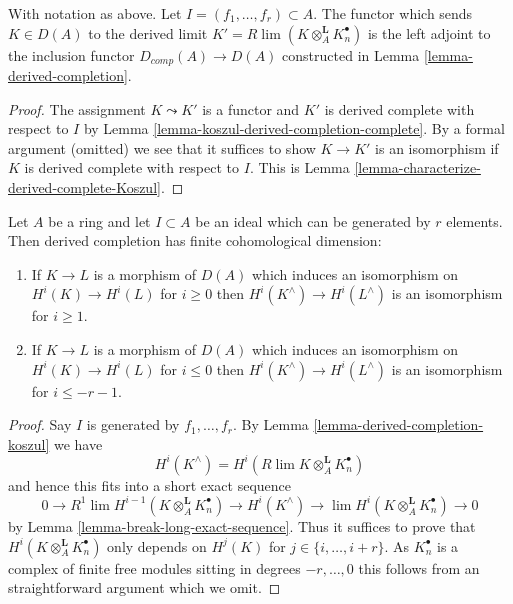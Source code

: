 \begin{lemma}
\label{lemma-derived-completion-koszul}
With notation as above. Let $I = (f_1, \ldots, f_r) \subset A$.
The functor which sends $K \in D(A)$ to the derived limit
$K' = R\lim( K \otimes_A^\mathbf{L} K_n^\bullet )$ is the left
adjoint to the inclusion functor $D_{comp}(A) \to D(A)$
constructed in Lemma \ref{lemma-derived-completion}.
\end{lemma}

\begin{proof}
The assignment $K \leadsto K'$ is a functor and $K'$ is derived
complete with respect to $I$ by
Lemma \ref{lemma-koszul-derived-completion-complete}.
By a formal argument (omitted) we see that it suffices
to show $K \to K'$ is an isomorphism if $K$ is derived complete
with respect to $I$. This is
Lemma \ref{lemma-characterize-derived-complete-Koszul}.
\end{proof}

\begin{lemma}
\label{lemma-derived-completion-finite-cohomological-dimension}
Let $A$ be a ring and let $I \subset A$ be an ideal which can be
generated by $r$ elements. Then derived completion has finite
cohomological dimension:
\begin{enumerate}
\item If $K \to L$ is a morphism of $D(A)$ which induces an isomorphism
on $H^i(K) \to H^i(L)$ for $i \geq 0$ then $H^i(K^\wedge) \to H^i(L^\wedge)$
is an isomorphism for $i \geq 1$.
\item If $K \to L$ is a morphism of $D(A)$ which induces an isomorphism
on $H^i(K) \to H^i(L)$ for $i \leq 0$ then $H^i(K^\wedge) \to H^i(L^\wedge)$
is an isomorphism for $i \leq -r - 1$.
\end{enumerate}
\end{lemma}

\begin{proof}
Say $I$ is generated by $f_1, \ldots, f_r$. By
Lemma \ref{lemma-derived-completion-koszul} we have
$$
H^i(K^\wedge) = H^i(R\lim K \otimes_A^\mathbf{L} K_n^\bullet)
$$
and hence this fits into a short exact sequence
$$
0 \to R^1\lim H^{i - 1}(K \otimes_A^\mathbf{L} K_n^\bullet)
\to H^i(K^\wedge) \to \lim H^i(K \otimes_A^\mathbf{L} K_n^\bullet) \to 0
$$
by Lemma \ref{lemma-break-long-exact-sequence}. Thus it suffices to prove
that $H^i(K \otimes_A^\mathbf{L} K_n^\bullet)$ only depends on
$H^j(K)$ for $j \in \{i, \ldots, i + r\}$. As $K_n^\bullet$ is a
complex of finite free modules sitting in degrees $-r, \ldots, 0$
this follows from an straightforward argument which we omit.
\end{proof}

